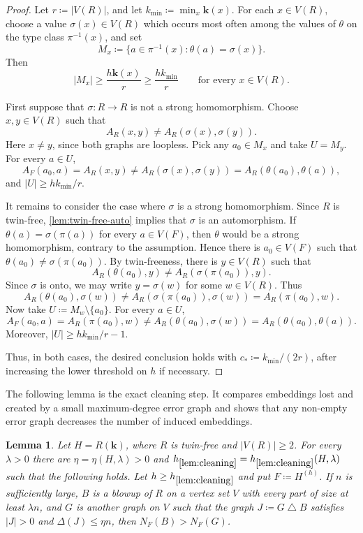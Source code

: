 \documentclass[10pt]{article}
\theoremstyle{plain}
\newtheorem{lemma}[lemma]{Lemma}
\theoremstyle{remark}
\newcommand{\symdiff}{\mathbin{\triangle}}
\begin{document}
\begin{proof}
Let $r\coloneqq |V(R)|$, and let $k_{\min}\coloneqq\min_x\mathbf k(x)$. For each $x\in V(R)$, choose a value $\sigma(x)\in V(R)$ which occurs most often among the values of $\theta$ on the type class $\pi^{-1}(x)$, and set
\[
        M_x\coloneqq\{a\in\pi^{-1}(x):\theta(a)=\sigma(x)\}.
\]
Then
\[
        |M_x|\ge \frac{h\mathbf k(x)}{r}\ge \frac{hk_{\min}}{r}
        \qquad\text{for every }x\in V(R).
\]

First suppose that $\sigma:R\to R$ is not a strong homomorphism. Choose $x,y\in V(R)$ such that
\[
        A_R(x,y)\ne A_R(\sigma(x),\sigma(y)).
\]
Here $x\ne y$, since both graphs are loopless. Pick any $a_0\in M_x$ and take $U=M_y$. For every $a\in U$,
\[
        A_F(a_0,a)=A_R(x,y)
        \ne A_R(\sigma(x),\sigma(y))
        =A_R(\theta(a_0),\theta(a)),
\]
and $|U|\ge hk_{\min}/r$.

It remains to consider the case where $\sigma$ is a strong homomorphism. Since $R$ is twin-free, \cref{lem:twin-free-auto} implies that $\sigma$ is an automorphism. If $\theta(a)=\sigma(\pi(a))$ for every $a\in V(F)$, then $\theta$ would be a strong homomorphism, contrary to the assumption. Hence there is $a_0\in V(F)$ such that $\theta(a_0)\ne\sigma(\pi(a_0))$. By twin-freeness, there is $y\in V(R)$ such that
\[
        A_R(\theta(a_0),y)\ne A_R(\sigma(\pi(a_0)),y).
\]
Since $\sigma$ is onto, we may write $y=\sigma(w)$ for some $w\in V(R)$. Thus
\[
        A_R(\theta(a_0),\sigma(w))
        \ne A_R(\sigma(\pi(a_0)),\sigma(w))=A_R(\pi(a_0),w).
\]
Now take $U\coloneqq M_w\setminus\{a_0\}$. For every $a\in U$,
\[
        A_F(a_0,a)=A_R(\pi(a_0),w)
        \ne A_R(\theta(a_0),\sigma(w))
        =A_R(\theta(a_0),\theta(a)).
\]
Moreover, $|U|\ge hk_{\min}/r-1$.

Thus, in both cases, the desired conclusion holds with $c_*\coloneqq k_{\min}/(2r)$, after increasing the lower threshold on $h$ if necessary.
\end{proof}

The following lemma is the exact cleaning step. It compares embeddings lost and created by a small maximum-degree error graph and shows that any non-empty error graph decreases the number of induced embeddings.

\begin{lemma}
\label{lem:cleaning}
Let $H=R(\mathbf k)$, where $R$ is twin-free and $|V(R)|\ge2$. For every $\lambda>0$ there are $\eta=\eta(H,\lambda)>0$ and $h_{\ref{lem:cleaning}}=h_{\ref{lem:cleaning}}(H,\lambda)$ such that the following holds. Let $h\ge h_{\ref{lem:cleaning}}$ and put $F\coloneqq H^{(h)}$. If $n$ is sufficiently large, $B$ is a blowup of $R$ on a vertex set $V$ with every part of size at least $\lambda n$, and $G$ is another graph on $V$ such that the graph $J\coloneqq G\symdiff B$ satisfies $|J| > 0$ and $\Delta(J)\le\eta n$, then $N_F(B)>N_F(G)$.
\end{lemma}
\end{document}
